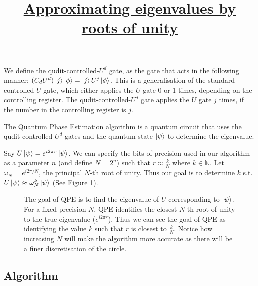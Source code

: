 \documentclass[12pt, a4paper]{article}
\begin{document}
	We define the qudit-controlled-$U^d$ gate, as the gate that acts in the following manner:
	$(C_dU^d) \ket{j}\ket{\phi} = \ket{j}U^j\ket{\phi}$. This is a generalisation of the standard controlled-$U$ gate, which either applies the $U$ gate 0 or 1 times, depending on the controlling register. The qudit-controlled-$U^d$ gate applies the $U$ gate $j$ times, if the number in the controlling register is $j$. 
	
	The Quantum Phase Estimation algorithm is a quantum circuit that uses the qudit-controlled-$U^d$ gates and the quantum state $\ket{\psi}$ to determine the eigenvalue. 
	
	Say $U \ket{\psi} = e^{i 2 \pi r} \ket{\psi}$. We can specify the bits of precision used in our algorithm as a parameter $n$ (and define $N = 2^n$) such that $r \approx \frac{k}{N}$ where $k\in \mathbb{N}$. Let $\omega_N = e^{i 2 \pi /N}$, the principal $N$-th root of unity. Thus our goal is to determine $k$ s.t. $U \ket{\psi} \approx \omega^{k}_N \ket{\psi}$ (See Figure \ref{fig:approx}). 
\begin{figure}
	\centering
	\title{\textbf{\underline{Approximating eigenvalues by roots of unity}}}
	\caption{The goal of QPE is to find the eigenvalue of $U$ corresponding to $\ket{\psi}$. For a fixed precision $N$, QPE identifies the closest $N$-th root of unity to the true eigenvalue ($e^{i 2 \pi r}$). Thus we can see the goal of QPE as identifying the value $k$ such that $r$ is closest to $\frac{k}{N}$. Notice how increasing $N$ will make the algorithm more accurate as there will be a finer discretisation of the circle.}
	\label{fig:approx}
\end{figure}

	
	
	\subsection{Algorithm}
	
\end{document}
